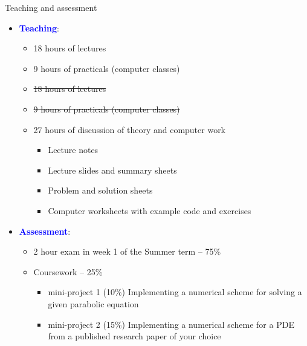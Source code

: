 \documentclass{beamer}
\begin{document}
\begin{frame}{Teaching and assessment}

\begin{itemize}

\item{} \textcolor{blue}{\textbf{Teaching}}:

\begin{itemize}

\item<1|only@1>{} 18 hours of lectures

\item<1|only@1> 9 hours of practicals (computer classes)

\item<2|only@2->{\sout{18 hours of lectures}}

\item<2|only@2->{\sout{9 hours of practicals (computer classes)}}

\item<2-|only@2-> 27 hours of discussion of theory and computer work
\begin{itemize}
\item<3-> Lecture notes
\item<3-> Lecture slides and summary sheets
\item<3-> Problem and solution sheets
\item<3-> Computer worksheets with example code and exercises
\end{itemize}

\end{itemize}
\pause
\item{} \textcolor{blue}{\textbf{Assessment}}: 

\begin{itemize}

\item<4-> 2 hour exam in week 1 of the
Summer term -- 75\% 

\item<5-> Coursework -- 25\%

\begin{itemize}

\item<6-> mini-project 1 (10\%) Implementing a numerical scheme for solving a given parabolic equation

\item<7-> mini-project 2 (15\%) Implementing a numerical scheme for a PDE from a published research paper of your choice

\end{itemize}

\end{itemize}

\end{itemize}



\end{frame}
\end{document}
